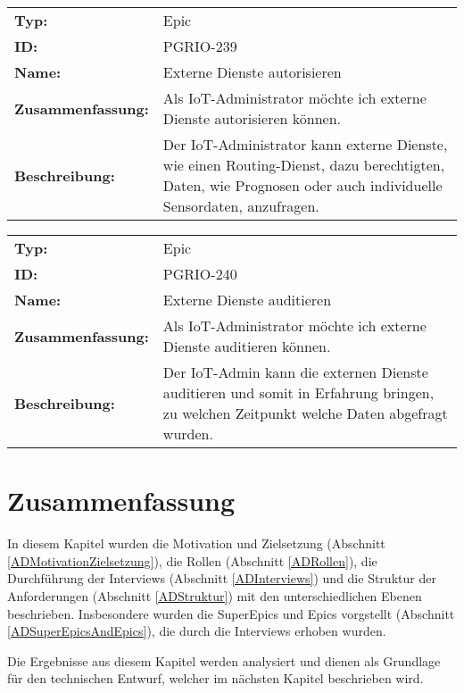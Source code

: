 		\begin{flushleft} 
\begin{tabular}{@{}lp{100mm}} 
\textbf{Typ:} & Epic \\ 
\textbf{ID:} & PGRIO-239 \\ 
\textbf{Name:} & Externe Dienste autorisieren \\ 
\textbf{Zusammenfassung:} & Als IoT-Administrator möchte ich externe Dienste autorisieren können. \\ 
\textbf{Beschreibung:} & Der IoT-Administrator kann externe Dienste, wie einen Routing-Dienst, dazu berechtigten, Daten, wie Prognosen oder auch individuelle Sensordaten, anzufragen. \\ 
\end{tabular} 
\end{flushleft} 

		\begin{flushleft} 
\begin{tabular}{@{}lp{100mm}} 
\textbf{Typ:} & Epic \\ 
\textbf{ID:} & PGRIO-240 \\ 
\textbf{Name:} & Externe Dienste auditieren \\ 
\textbf{Zusammenfassung:} & Als IoT-Administrator möchte ich externe Dienste auditieren können. \\ 
\textbf{Beschreibung:} & Der IoT-Admin kann die externen Dienste auditieren und somit in Erfahrung bringen, zu welchen Zeitpunkt welche Daten abgefragt wurden. \\ 
\end{tabular} 
\end{flushleft} 

\section{Zusammenfassung}\label{ADZusammenfassung}
In diesem Kapitel wurden die Motivation und Zielsetzung (Abschnitt \ref{ADMotivationZielsetzung}), die Rollen (Abschnitt \ref{ADRollen}), die Durchführung der Interviews (Abschnitt \ref{ADInterviews}) und die Struktur der Anforderungen (Abschnitt \ref{ADStruktur}) mit den unterschiedlichen Ebenen beschrieben. Insbesondere wurden die SuperEpics und Epics vorgstellt (Abschnitt \ref{ADSuperEpicsAndEpics}), die durch die Interviews erhoben wurden.

Die Ergebnisse aus diesem Kapitel werden analysiert und dienen als Grundlage für den technischen Entwurf, welcher im nächsten Kapitel beschrieben wird.




	
